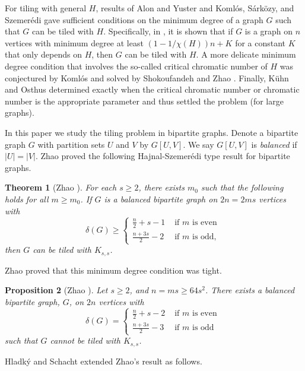 \documentclass[oneside,12pt]{memoir}
\newtheorem{theorem}{Theorem}[section]
\newtheorem{proposition}[theorem]{Proposition}
\begin{document}
For tiling with general $H$, results of Alon and Yuster \cite{Alon} and Koml\'{o}s, S\'{a}rk\"{o}zy, and  Szemer\'edi \cite{KSS} gave sufficient conditions on the minimum degree of a graph $G$ such that $G$ can be tiled with $H$.  Specifically, in \cite{KSS}, it is shown that if $G$ is a graph on $n$ vertices with minimum degree at least $\left (1 - 1/\chi(H)\right)n +K$ for a constant $K$ that only depends on $H$, then $G$ can be tiled with $H$.  A more delicate minimum degree condition that involves the so-called critical chromatic number of $H$ was conjectured by Koml\'os and solved by Shokoufandeh and Zhao \cite{Zh}.  Finally, K\"{u}hn and Osthus \cite{KO} determined exactly when the critical chromatic number or chromatic number is the appropriate parameter and thus settled the problem (for large graphs).

In this paper we study the tiling problem in bipartite graphs.  Denote a bipartite graph $G$ with partition sets $U$ and $V$ by $G[U, V]$.  We say $G[U,V]$ is \emph{balanced} if $|U|=|V|$.  Zhao proved the following Hajnal-Szemer\'edi type result for bipartite graphs.

\begin{theorem}[Zhao \cite{Z}]
For each $s\geq 2$, there exists $m_0$ such that the following holds for all $m\geq m_0$.  If $G$ is a balanced bipartite graph on $2n=2ms$ vertices with 
$$\delta(G)\geq \left\lbrace \begin{array}{ll} \frac{n}{2}+s-1   & \text{ if } m \text{ is even } \\
              \frac {n+3s}{2}-2 & \text{ if } m \text{ is odd, } \end{array} \right. $$
then $G$ can be tiled with $K_{s,s}$.
\end{theorem}
Zhao proved that this minimum degree condition was tight.

\begin{proposition}[Zhao \cite{Z}]
Let $s\geq 2$, and $n=ms\geq 64s^2$.  There exists a balanced bipartite graph, $G$, on $2n$ vertices with
$$\delta(G)= \left\lbrace \begin{array}{ll} \frac{n}{2}+s-2   & \text{ if } m \text{ is even } \\
              \frac {n+3s}{2}-3 & \text{ if } m \text{ is odd } \end{array} \right. $$
such that $G$ cannot be tiled with $K_{s,s}$.
\end{proposition}

Hladk\'{y} and Schacht extended Zhao's result as follows.
\end{document}
